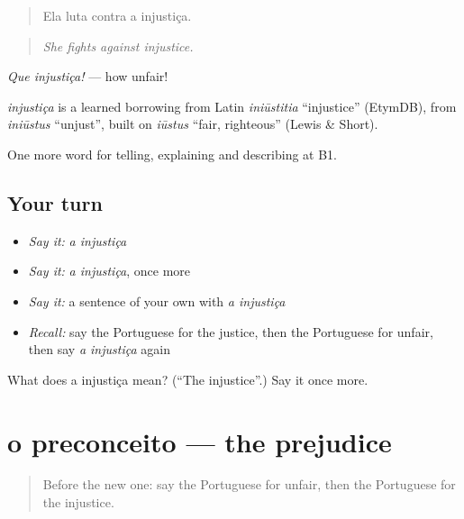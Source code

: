 \begin{quote}
Ela luta contra a injustiça.
\end{quote}

\begin{quote}
\emph{She fights against injustice.}
\end{quote}

\emph{Que injustiça!} — how unfair!

\begin{cousinweb}
\emph{injustiça} is a learned borrowing from Latin \emph{iniūstitia} \textquotedblleft{}injustice\textquotedblright{} (EtymDB), from \emph{iniūstus} \textquotedblleft{}unjust\textquotedblright{}, built on \emph{iūstus} \textquotedblleft{}fair, righteous\textquotedblright{} (Lewis \& Short).
\end{cousinweb}

\begin{grammarlens}[title={What you've built}]
One more word for telling, explaining and describing at B1.
\end{grammarlens}

\subsection*{Your turn}
\begin{itemize}
\raggedright
  \item \emph{Say it:} \emph{a injustiça}
  \item \emph{Say it:} \emph{a injustiça}, once more
  \item \emph{Say it:} a sentence of your own with \emph{a injustiça}
  \item \emph{Recall:} say the Portuguese for the justice, then the Portuguese for unfair, then say \emph{a injustiça} again
\end{itemize}

\begin{tcolorbox}[breakable,colback=teal!4,colframe=teal!35!black,title={Before you move on}]
What does a injustiça mean? (\textquotedblleft{}The injustice\textquotedblright{}.) Say it once more.
\end{tcolorbox}
\section[o preconceito]{o preconceito — the prejudice}

\label{lesson:PT-C365-preconceito}



\begin{quote}
Before the new one: say the Portuguese for unfair, then the Portuguese for the injustice.
\end{quote}

